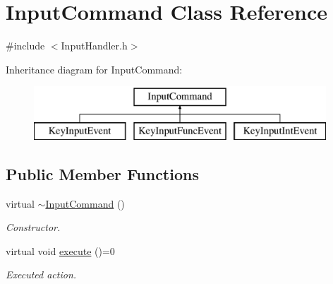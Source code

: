 \hypertarget{class_input_command}{}\section{Input\+Command Class Reference}
\label{class_input_command}


{\ttfamily \#include $<$Input\+Handler.\+h$>$}

Inheritance diagram for Input\+Command\+:\begin{figure}[H]
\begin{center}
\leavevmode
\includegraphics[height=2.000000cm]{class_input_command}
\end{center}
\end{figure}
\subsection*{Public Member Functions}
\begin{DoxyCompactItemize}
\item 
\mbox{\label{class_input_command_a203385c2bfacb53d17ac5749ee274dc0}} 
virtual \mbox{\hyperlink{class_input_command_a203385c2bfacb53d17ac5749ee274dc0}{$\sim$\+Input\+Command}} ()
\begin{DoxyCompactList}\small\item\em Constructor. \end{DoxyCompactList}\item 
\mbox{\label{class_input_command_a636f23300e444dcc55f7898971874a8f}} 
virtual void \mbox{\hyperlink{class_input_command_a636f23300e444dcc55f7898971874a8f}{execute}} ()=0
\begin{DoxyCompactList}\small\item\em Executed action. \end{DoxyCompactList}\end{DoxyCompactItemize}
